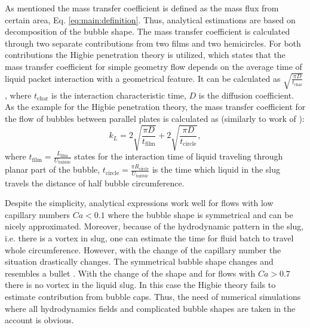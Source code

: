 \documentclass{article}
\newcommand{\beq}{\begin{equation}}
\newcommand{\feq}{\end{equation}}
\newcommand{\lfilm}{L_{\mathrm{film}}}
\newcommand{\ububble}{U_{\mathrm{bubble}}}
\begin{document}
As mentioned  the mass transfer coefficient is defined as the mass flux from certain area, Eq. \ref{eq:main:definition}. Thus, analytical estimations \cite{kreutzer-overview,irandoust} are  based on decomposition of the bubble shape. The mass transfer coefficient is calculated through two separate contributions from two films and two hemicircles. For both contributions the Higbie penetration theory \cite{higbie} is utilized, which states that the mass transfer coefficient  for simple geometry flow depends on the average time of liquid packet interaction with a geometrical feature. It can be calculated as $\sqrt{\frac{\pi D}{t_{\mathrm{char}}}}$, where $t_{\mathrm{char}}$ is the interaction characteristic time, $D$ is the diffusion coefficient. As the example for the Higbie penetration theory, the mass  transfer coefficient for the flow of bubbles between parallel plates  is calculated as (similarly to work of \citet{vanbaten-circular}):
\beq
k_L=2 \sqrt{\frac{\pi D}{t_{\mathrm{film}}}}+2 \sqrt{\frac{\pi D}{t_{\mathrm{circle}}}},
\feq
where $t_{\mathrm{film}}=\frac{\lfilm}{\ububble}$ states for the interaction time of liquid traveling through planar part of the bubble, $t_{\mathrm{circle}}=\frac{\pi R_{\mathrm{circle}}}{\ububble}$ is the time which liquid in the slug travels the distance of half bubble circumference. 

Despite the simplicity, analytical expressions work well for flows with low capillary numbers $Ca<0.1$ \cite{bercic-mass} where the bubble shape is symmetrical and can be nicely approximated. Moreover, because of the hydrodynamic pattern in the slug, i.e. there is a vortex in slug, one can estimate the time for fluid batch to travel whole circumference.   However, with the change of the capillary number the situation drastically changes. The symmetrical bubble shape changes and resembles a bullet \cite{kuzmin-binary2d}. With the change of the shape and for flows with $Ca>0.7$ there is no vortex in the liquid slug. In this case the Higbie theory fails to estimate contribution from bubble caps. Thus, the need of numerical simulations where all hydrodynamics fields and complicated bubble shapes are taken in the account is obvious. 
\end{document}
